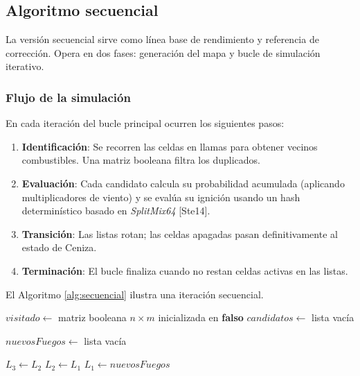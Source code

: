 \documentclass[10pt,a4paper]{article}
\begin{document}
\subsection{Algoritmo secuencial}
La versión secuencial sirve como línea base de rendimiento y referencia de corrección. Opera en dos fases: generación del mapa y bucle de simulación iterativo.

\subsubsection{Flujo de la simulación}
En cada iteración del bucle principal ocurren los siguientes pasos:
\begin{enumerate}
    \item \textbf{Identificación}: Se recorren las celdas en llamas para obtener vecinos combustibles. Una matriz booleana filtra los duplicados.
    \item \textbf{Evaluación}: Cada candidato calcula su probabilidad acumulada (aplicando multiplicadores de viento) y se evalúa su ignición usando un hash determinístico basado en \textit{SplitMix64} [Ste14].
    \item \textbf{Transición}: Las listas rotan; las celdas apagadas pasan definitivamente al estado de Ceniza.
    \item \textbf{Terminación}: El bucle finaliza cuando no restan celdas activas en las listas.
\end{enumerate}

El Algoritmo \ref{alg:secuencial} ilustra una iteración secuencial.

\begin{algorithm}[H]
\caption{Iteración del algoritmo secuencial de propagación}\label{alg:secuencial}

$visitado \leftarrow$ matriz booleana $n \times m$ inicializada en \textbf{falso}\;
$candidatos \leftarrow$ lista vacía\;


$nuevosFuegos \leftarrow$ lista vacía\;


$L_3 \leftarrow L_2$\;
$L_2 \leftarrow L_1$\;
$L_1 \leftarrow nuevosFuegos$\;

\end{algorithm}
\end{document}
